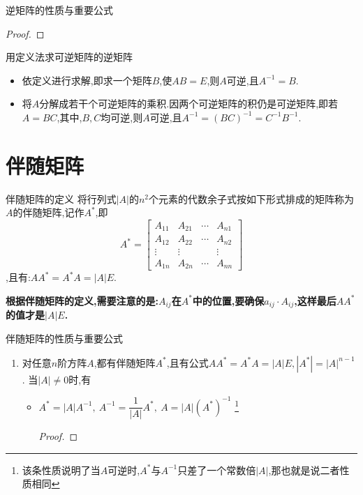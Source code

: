 \documentclass[8pt a4paper,oneside,UTF8]{ctexbook}
\begin{document}
\begin{sloppypar}
\begin{criterion}{逆矩阵的性质与重要公式}{}
\begin{enumerate}
\begin{proof}
                  \end{proof}
        \end{enumerate}
    \end{criterion}
    \begin{criterion}{用定义法求可逆矩阵的逆矩阵}{}
        \begin{itemize}
            \item 依定义进行求解,即求一个矩阵$B$,使$AB=E$,则$A$可逆,且$A^{-1}=B$.
            \item 将$A$分解成若干个可逆矩阵的乘积.因两个可逆矩阵的积仍是可逆矩阵,即若$A=BC$,其中,$B,C$均可逆,则$A$可逆,且$A^{-1}=(BC)^{-1}=C^{-1}B^{-1}$.
        \end{itemize}
    \end{criterion}
    \section{伴随矩阵}
    \begin{defn}{伴随矩阵的定义}{}
        将行列式$|A|$的$n^2$个元素的代数余子式按如下形式排成的矩阵称为$A$的伴随矩阵,记作$A^*$,即
        $$A^{*}=
            \begin{bmatrix}
                A_{11} & A_{21} & \cdots & A_{n1} \\
                A_{12} & A_{22} & \cdots & A_{n2} \\
                \vdots & \vdots &        & \vdots \\
                A_{1n} & A_{2n} & \cdots & A_{nn}
            \end{bmatrix}
        $$,且有:$AA^{*}=A^{*}A=|A|E$.
    \end{defn}
    \textbf{根据伴随矩阵的定义,需要注意的是:$A_{ij}$在$A^*$中的位置,要确保$a_{ij} \cdot A_{ij}$,这样最后$AA^*$的值才是$|A|E$.}
    \begin{criterion}{伴随矩阵的性质与重要公式}{}
        \begin{enumerate}
            \item 对任意$n$阶方阵$A$,都有伴随矩阵$A^*$,且有公式$AA^{*}=A^{*}A=\left|A\right|E,\left|A^{*}\right|=\left|A\right|^{n-1}$.\newline
                  当$|A|\neq 0$时,有
                  \begin{itemize}
                      \item $A^{*}=\left|A\right|A^{-1},\:A^{-1}=\dfrac{1}{\left|A\right|}A^{*},\:A=\left|A\right|(A^{*})^{-1}$ \footnote{该条性质说明了当$A$可逆时,$A^*$与$A^{-1}$只差了一个常数倍$|A|$,那也就是说二者性质相同}
                            \begin{proof}

\end{proof}
\end{itemize}
\end{enumerate}
\end{criterion}
\end{sloppypar}
\end{document}

